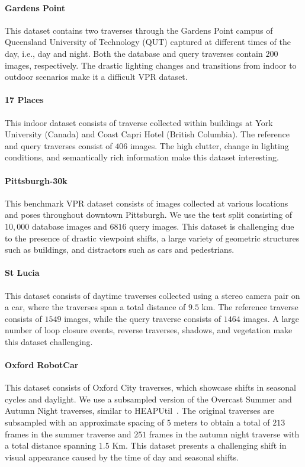 \documentclass[letterpaper, 10 pt, conference]{ieeeconf}  \fi
\begin{document}
\paragraph{Gardens Point} This dataset contains two traverses through the Gardens Point campus of Queensland University of Technology (QUT) captured at different times of the day, i.e., day and night. Both the database and query traverses contain $200$ images, respectively. The drastic lighting changes and transitions from indoor to outdoor scenarios make it a difficult VPR dataset.

\paragraph{17 Places} This indoor dataset consists of traverse collected within buildings at York University (Canada) and Coast Capri Hotel (British Columbia). The reference and query traverses consist of $406$ images. The high clutter, change in lighting conditions, and semantically rich information make this dataset interesting.

\paragraph{Pittsburgh-30k} This benchmark VPR dataset consists of images collected at various locations and poses throughout downtown Pittsburgh. We use the test split consisting of $10,000$ database images and $6816$ query images. This dataset is challenging due to the presence of drastic viewpoint shifts, a large variety of geometric structures such as buildings, and distractors such as cars and pedestrians.

\paragraph{St Lucia} This dataset consists of daytime traverses collected using a stereo camera pair on a car, where the traverses span a total distance of $9.5$ km. The reference traverse consists of $1549$ images, while the query traverse consists of $1464$ images. A large number of loop closure events, reverse traverses, shadows, and vegetation make this dataset challenging.

\paragraph{Oxford RobotCar} This dataset consists of Oxford City traverses, which showcase shifts in seasonal cycles and daylight. We use a subsampled version of the Overcast Summer and Autumn Night traverses, similar to HEAPUtil~\cite{keetha2021hierarchical}. The original traverses are subsampled with an approximate spacing of $5$ meters to obtain a total of $213$ frames in the summer traverse and $251$ frames in the autumn night traverse with a total distance spanning $1.5$ Km. This dataset presents a challenging shift in visual appearance caused by the time of day and seasonal shifts.
\end{document}
